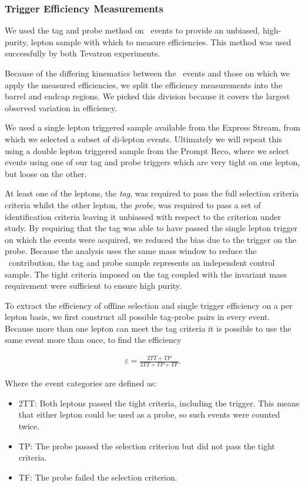 \subsubsection{Trigger Efficiency Measurements}
 
We used the tag and probe method on \dyll~events to provide an unbiased, high-purity, 
lepton sample with which to measure efficiencies.
This method was used successfully by both Tevatron experiments.

Because of the differing kinematics between the \dyll~events and those on which we apply the measured efficiencies,
we split the efficiency measurements into the barrel and endcap regions.
We picked this division because it covers the largest observed variation in efficiency.

We used a single lepton triggered sample available from the Express Stream, 
from which we selected a subset of di-lepton events.
Ultimately we will repeat this using a double lepton triggered sample from the Prompt Reco,
where we select events using one of our tag and probe triggers which are very tight on one lepton,
but loose on the other.

At least one of the leptons, the {\it tag}, was required to pass the full selection criteria criteria 
whilst the other lepton, the {\it probe}, was required to pass a set of identification criteria leaving 
it unbiassed with respect to the criterion under study. 
By requiring that the tag was able to have passed the single lepton trigger on which the events were acquired, 
we reduced the bias due to the trigger on the probe.
Because the analysis uses the same mass window to reduce the \dyll~contribution, 
the tag and probe sample represents an independent control sample.
The tight criteria imposed on the tag coupled with the invariant mass requirement were sufficient to ensure high purity.

To extract the efficiency of offline selection and single trigger efficiency on a per lepton basis, 
we first construct all possible tag-probe pairs in every event.
Because more than one lepton can meet the tag criteria it is possible to use the same event more than once, to find the efficiency

\begin{eqnarray}
\label{eqn:tagAndProbeEfficiencyEqn}
\varepsilon = \frac{2TT + TP}{2TT + TP + TF}.
\end{eqnarray}

Where the event categories are defined as:

\begin{itemize}
	\item 2TT: Both leptons passed the tight criteria, including the trigger. This means that either lepton could be used as a probe, 
	so such events were counted twice.
	\item TP: The probe passed the selection criterion but did not pass the tight criteria.
	\item TF: The probe failed the selection criterion.
\end{itemize}

